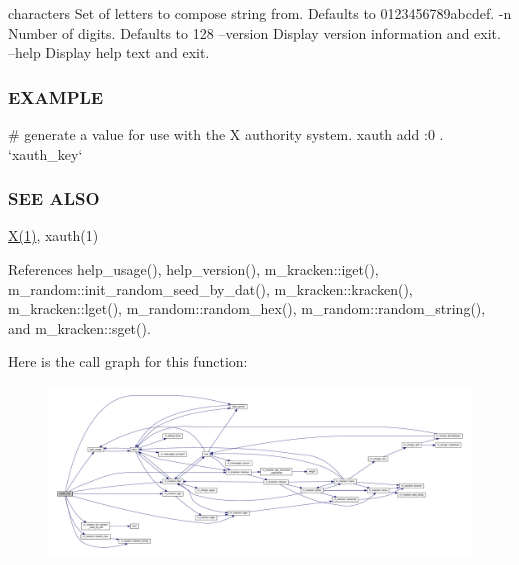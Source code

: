 characters Set of letters to compose string from. Defaults to \textquotesingle{}0123456789abcdef\textquotesingle{}. -\/n Number of digits. Defaults to 128 --version Display version information and exit. --help Display help text and exit. \subsubsection*{E\+X\+A\+M\+P\+LE}

\begin{DoxyVerb}# generate a value for use with the X authority system.
xauth add :0 . `xauth_key`
\end{DoxyVerb}
 \subsubsection*{S\+EE A\+L\+SO}

\hyperlink{intro__blas1_83_8txt_a7af7e1e13fc78374475d1be13503ee6e}{X(1)}, xauth(1) 

References help\+\_\+usage(), help\+\_\+version(), m\+\_\+kracken\+::iget(), m\+\_\+random\+::init\+\_\+random\+\_\+seed\+\_\+by\+\_\+dat(), m\+\_\+kracken\+::kracken(), m\+\_\+kracken\+::lget(), m\+\_\+random\+::random\+\_\+hex(), m\+\_\+random\+::random\+\_\+string(), and m\+\_\+kracken\+::sget().

Here is the call graph for this function\+:
\nopagebreak
\begin{figure}[H]
\begin{center}
\leavevmode
\includegraphics[width=350pt]{xauth__key_8f90_a0f9a35aa83e47ebe911d6c02ac4f5798_cgraph}
\end{center}
\end{figure}
